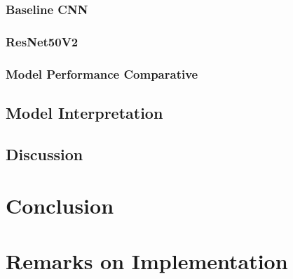 \documentclass[biblatexBackend=bibtex]{tumthesis}
\begin{document}
\subsection{Baseline CNN}
\label{sec:results:bl_cnn}

\subsection{ResNet50V2}
\label{sec:results:RN50V2}

\subsection{Model Performance Comparative}
\label{sec:results:comparative}


\section{Model Interpretation}
\label{sec:results:model_interpretation}


\section{Discussion}

\chapter{Conclusion}
\label{ch:Conclusion}


\appendix

\chapter{Remarks on Implementation}
\label{Appendix-Implementation}

\end{document}
